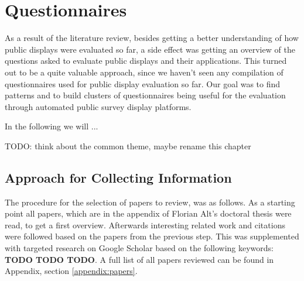 \section{Questionnaires}
\label{sec:questionnaires}

As a result of the literature review, besides getting a better understanding of how public displays were evaluated so far, a side effect was getting an overview of the questions asked to evaluate public displays and their applications. This turned out to be a quite valuable approach, since we haven't seen any compilation of  questionnaires used for public display evaluation so far. Our goal was to find patterns and to build clusters of questionnaires being useful for the evaluation through automated public survey display platforms.






In the following we will ...


TODO: think about the common theme, maybe rename this chapter



\subsection{Approach for Collecting Information}

	The procedure for the selection of papers to review, was as follows. As a starting point all papers, which are in the appendix of Florian Alt's doctoral thesis\cite{alt2013thesis} were read, to get a first overview. Afterwards interesting related work and citations were followed based on the papers from the previous step. This was supplemented with targeted research on Google Scholar based on the following keywords: \textbf{TODO TODO TODO}. A full list of all papers reviewed can be found in Appendix, section \ref{appendix:papers}.

